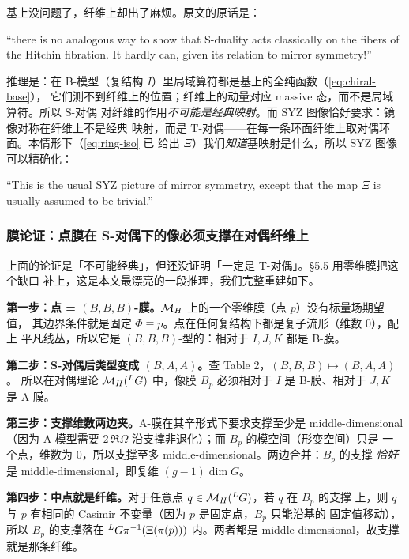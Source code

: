 基上没问题了，纤维上却出了麻烦。原文的原话是：\pA{}
\begin{origquote}
“there is no analogous way to show that S-duality acts classically on the fibers of the Hitchin fibration. It hardly can, given its relation to mirror symmetry!”
\end{origquote}
推理是：在 B-模型（复结构 $I$）里局域算符都是基上的全纯函数（\eqref{eq:chiral-base}），
它们测不到纤维上的位置；纤维上的动量对应 massive 态，而不是局域算符。所以 S-对偶
对纤维的作用\emph{不可能是经典映射}。而 SYZ 图像恰好要求：镜像对称在纤维上不是经典
映射，而是 T-对偶——在每一条环面纤维上取对偶环面。本情形下（\eqref{eq:ring-iso} 已
给出 $\Xi$）我们\emph{知道}基映射是什么，所以 SYZ 图像可以精确化：\pA{}
\begin{origquote}
“This is the usual SYZ picture of mirror symmetry, except that the map $\Xi$ is usually assumed to be trivial.” 
\end{origquote}

\subsubsection*{膜论证：点膜在 S-对偶下的像必须支撑在对偶纤维上}

上面的论证是「不可能经典」，但还没证明「一定是 T-对偶」。§5.5 用零维膜把这个缺口
补上，这是本文最漂亮的一段推理，我们完整重建如下。\pA{}

\textbf{第一步：点 = $(B,B,B)$-膜。}$\mathcal{M}_H$ 上的一个零维膜（点 $p$）没有标量场期望值，
其边界条件就是固定 $\Phi\equiv p$。点在任何复结构下都是复子流形（维数 $0$），配上
平凡线丛，所以它是 $(B,B,B)$-型的：相对于 $I,J,K$ 都是 B-膜。

\textbf{第二步：S-对偶后类型变成 $(B,A,A)$。}查 Table 2，$(B,B,B)\mapsto(B,A,A)$。
所以在对偶理论 $\mathcal{M}_H({}^{L}G)$ 中，像膜 $B_p$ 必须相对于 $I$ 是 B-膜、相对于
$J,K$ 是 A-膜。

\textbf{第三步：支撑维数两边夹。}A-膜在其辛形式下要求支撑至少是 middle-dimensional
（因为 A-模型需要 $2\,\Re\Omega$ 沿支撑非退化）；而 $B_p$ 的模空间（形变空间）只是
一个点，维数为 $0$，所以支撑至多 middle-dimensional。两边合并：$B_p$ 的支撑
\emph{恰好}是 middle-dimensional，即复维 $(g-1)\dim G$。

\textbf{第四步：中点就是纤维。}对于任意点 $q\in\mathcal{M}_H({}^{L}G)$，若 $q$ 在 $B_p$ 的支撑
上，则 $q$ 与 $p$ 有相同的 Casimir 不变量（因为 $p$ 是固定点，$B_p$ 只能沿基的
固定值移动），所以 $B_p$ 的支撑落在 ${}^{L}G\pi^{-1}(\Xi(\pi(p)))$ 内。两者都是
middle-dimensional，故支撑就是那条纤维。

